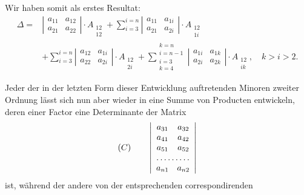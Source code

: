 \documentclass[11pt]{article}
\providecommand{\weq}[2]{\begin{equation}\tag{#1}#2\end{equation}}
\let\Delta\varDelta
\begin{document}
Wir haben somit als erstes Resultat:
\weq{1}{
\begin{aligned}
\Delta = {}& \left|\begin{array}{cc} a_{11} & a_{12}\\ a_{21} & a_{22}\end{array}\right|\cdot A_{\substack{12\\12}}
+ \sum_{i=3}^{i=n}\left|\begin{array}{cc} a_{11} & a_{1i}\\ a_{21} & a_{2i}\end{array}\right|\cdot A_{\substack{12\\1i}}\\
&+ \sum_{i=3}^{i=n}\left|\begin{array}{cc} a_{12} & a_{1i}\\ a_{22} & a_{2i}\end{array}\right|\cdot A_{\substack{12\\2i}}
+ \sum_{\substack{i=3\\k=4}}^{\substack{k=n\\i=n-1}}\left|\begin{array}{cc} a_{1i} & a_{1k}\\ a_{2i} & a_{2k}\end{array}\right|\cdot A_{\substack{12\\ik}},\quad k>i>2.
\end{aligned}
}

Jeder der in der letzten Form dieser Entwicklung auftretenden Minoren zweiter Ordnung lässt sich nun aber wieder in eine Summe von Producten entwickeln, deren einer Factor eine Determinante der Matrix
\[
(C)\qquad \left|\begin{array}{cc}
a_{31} & a_{32}\\
a_{41} & a_{42}\\
a_{51} & a_{52}\\
\hdotsfor{2}\\
a_{n1} & a_{n2}
\end{array}\right|
\]
ist, während der andere von der entsprechenden correspondirenden
\end{document}
